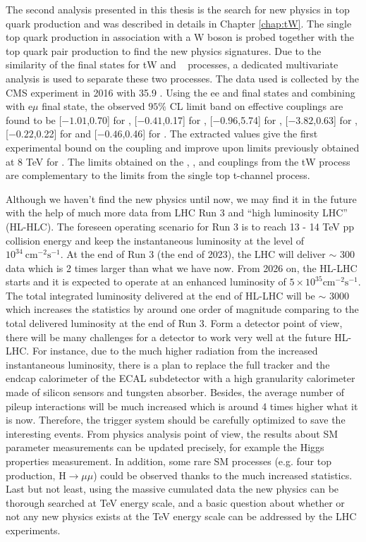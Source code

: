 The second analysis presented in this thesis is the search for new physics in top quark production and was described in details in Chapter \ref{chap:tW}. The single top quark production in association with a W boson is probed together with the top quark pair production to find the new physics signatures. Due to the similarity of the final states for tW and \ttbar~ processes, a dedicated multivariate analysis is used to separate these two processes. The data used is collected by the CMS experiment in 2016 with 35.9 \fbinv. Using the ee and \mumu final states and combining with e$\mu$ final state, the observed $95\%$ CL limit band on effective couplings are found to be [$-1.01$,0.70] for \CG, [$-0.41$,0.17]  for \CtG, [$-0.96$,5.74]  for \CtW, [$-3.82$,0.63] for \Cphiq, [$-0.22$,0.22] for \CuG and [$-0.46$,0.46] for \CcG. The extracted values give the first experimental bound on the \CG coupling and improve upon limits previously obtained at 8 TeV for \CtG. The limits obtained on the \CtW, \Cphiq, \CuG and \CcG couplings from the tW process are complementary to the limits from the single top t-channel process.

Although we haven't find the new physics until now, we may find it in the future with the help of much more data from LHC Run 3 and ``high luminosity LHC'' (HL-HLC). The foreseen operating scenario for Run 3 is to reach 13 - 14 TeV pp collision energy and keep the instantaneous luminosity at the level of $10^{34}~\mathrm{cm^{-2}s^{-1}}$. At the end of Run 3 (the end of 2023), the LHC will deliver $\sim$ 300 \fbinv data which is 2 times larger than what we have now. From 2026 on, the HL-LHC starts and it is expected to operate at an enhanced luminosity of $5\times10^{35} \mathrm{cm^{-2}s^{-1}}$. The total integrated luminosity delivered at the end of HL-LHC will be $\sim$ 3000 \fbinv which increases the statistics by around one order of magnitude comparing to the total delivered luminosity at the end of Run 3. Form a detector point of view, there will be many challenges for a detector to work very well at the future HL-LHC. For instance, due to the much higher radiation from the increased instantaneous luminosity, there is a plan to replace the full tracker and the endcap calorimeter of the ECAL subdetector with a high granularity calorimeter made of silicon sensors and tungsten absorber. Besides, the average number of pileup interactions will be much increased which is around 4 times higher what it is now. Therefore, the trigger system should be carefully optimized to save the interesting events. From physics analysis point of view, the results about SM parameter measurements can be updated precisely, for example the Higgs properties measurement. In addition, some rare SM processes (e.g. four top production, $\mathrm{H}\rightarrow\mu\mu$) could be observed thanks to the much increased statistics. Last but not least, using the massive cumulated data the new physics can be thorough searched at TeV energy scale, and a basic question about whether or not any new physics exists at the TeV energy scale can be addressed by the LHC experiments.



